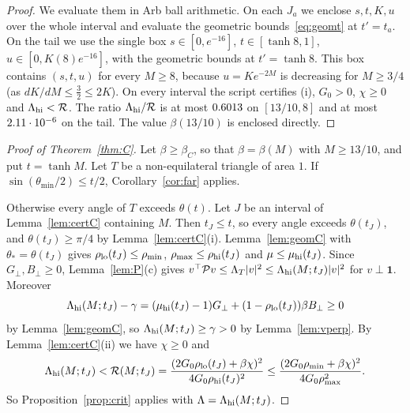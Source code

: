 \documentclass[11pt]{article}
\theoremstyle{remark}
\newcommand{\one}{\mathbf 1}
\newcommand{\Gp}{G_{\perp}}
\newcommand{\Bp}{B_{\perp}}
\begin{document}
\begin{proof}
We evaluate them in Arb ball arithmetic. On each $J_a$ we enclose $s,t,K,u$ over the whole interval and
evaluate the geometric bounds~\eqref{eq:geomt} at $t'=t_a$. On the tail we use the single box
$s\in[0,e^{-16}]$, $t\in[\tanh8,1]$, $u\in[0,K(8)e^{-16}]$, with the geometric bounds at $t'=\tanh8$. This
box contains $(s,t,u)$ for every $M\ge8$, because $u=Ke^{-2M}$ is decreasing for $M\ge3/4$ (as
$dK/dM\le\frac32\le2K$). On every interval the script certifies (i), $G_0>0$, $\chi\ge0$ and
$\Lambda_{\rm hi}<\mathcal R$. The ratio $\Lambda_{\rm hi}/\mathcal R$ is at most $0.6013$ on
$[13/10,8]$ and at most $2.11\cdot10^{-6}$ on the tail. The value $\beta(13/10)$ is enclosed directly.
\end{proof}

\begin{proof}[Proof of Theorem~\ref{thm:C}]
Let $\beta\ge\beta_C$, so that $\beta=\beta(M)$ with $M\ge13/10$, and put $t=\tanh M$. Let $T$ be a
non-equilateral triangle of area $1$. If $\sin(\theta_{\min}/2)\le t/2$, Corollary~\ref{cor:far} applies.

Otherwise every angle of $T$ exceeds $\theta(t)$. Let $J$ be an interval of Lemma~\ref{lem:certC}
containing $M$. Then $t_J\le t$, so every angle exceeds $\theta(t_J)$, and $\theta(t_J)\ge\pi/4$ by
Lemma~\ref{lem:certC}(i). Lemma~\ref{lem:geomC} with $\theta_*=\theta(t_J)$ gives
$\rho_{\rm lo}(t_J)\le\rho_{\min}$, $\rho_{\max}\le\rho_{\rm hi}(t_J)$ and $\mu\le\mu_{\rm hi}(t_J)$. Since
$\Gp,\Bp\ge0$, Lemma~\ref{lem:P}(c) gives
$v^\top\mathcal Pv\le\Lambda_T|v|^2\le\Lambda_{\rm hi}(M;t_J)|v|^2$ for $v\perp\one$. Moreover
\[
\Lambda_{\rm hi}(M;t_J)-\gamma=(\mu_{\rm hi}(t_J)-1)\Gp+(1-\rho_{\rm lo}(t_J))\beta \Bp\ge0
\]
by Lemma~\ref{lem:geomC}, so $\Lambda_{\rm hi}(M;t_J)\ge\gamma>0$ by Lemma~\ref{lem:vperp}. By
Lemma~\ref{lem:certC}(ii) we have $\chi\ge0$ and
\[
 \Lambda_{\rm hi}(M;t_J)<\mathcal R(M;t_J)=\frac{(2G_0\rho_{\rm lo}(t_J)+\beta\chi)^2}{4G_0\rho_{\rm hi}(t_J)^2}
 \le\frac{(2G_0\rho_{\min}+\beta\chi)^2}{4G_0\rho_{\max}^2}.
\]
So Proposition~\ref{prop:crit} applies with $\Lambda=\Lambda_{\rm hi}(M;t_J)$.
\end{proof}
\end{document}
